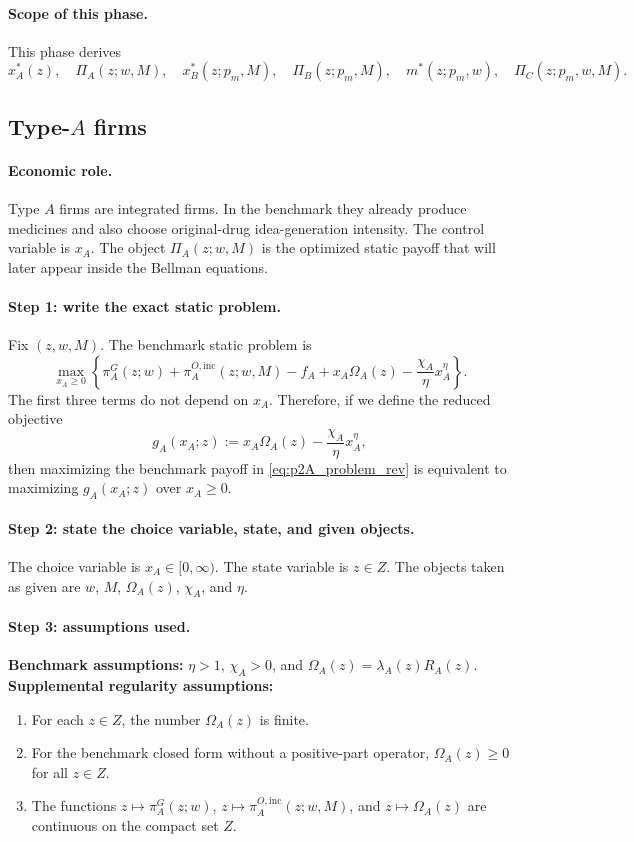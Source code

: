\paragraph{Scope of this phase.}
This phase derives
\[
x_A^*(z),\quad \Pi_A(z;w,M),\quad
x_B^*(z;p_m,M),\quad \Pi_B(z;p_m,M),\quad
m^*(z;p_m,w),\quad \Pi_C(z;p_m,w,M).
\]

\subsection{Type-$A$ firms}

\paragraph{Economic role.}
Type $A$ firms are integrated firms. In the benchmark they already produce medicines and also choose original-drug idea-generation intensity. The control variable is $x_A$. The object $\Pi_A(z;w,M)$ is the optimized static payoff that will later appear inside the Bellman equations.

\paragraph{Step 1: write the exact static problem.}
Fix $(z,w,M)$. The benchmark static problem is
\begin{equation}
\max_{x_A\ge 0}
\left\{
\pi_A^G(z;w)+\pi_A^{O,\mathrm{inc}}(z;w,M)-f_A
+x_A\Omega_A(z)-\frac{\chi_A}{\eta}x_A^\eta
\right\}.
\label{eq:p2A_problem_rev}
\end{equation}
The first three terms do not depend on $x_A$. Therefore, if we define the reduced objective
\[
g_A(x_A;z):=x_A\Omega_A(z)-\frac{\chi_A}{\eta}x_A^\eta,
\]
then maximizing the benchmark payoff in \eqref{eq:p2A_problem_rev} is equivalent to maximizing $g_A(x_A;z)$ over $x_A\ge 0$.

\paragraph{Step 2: state the choice variable, state, and given objects.}
The choice variable is $x_A\in[0,\infty)$. The state variable is $z\in Z$. The objects taken as given are $w$, $M$, $\Omega_A(z)$, $\chi_A$, and $\eta$.

\paragraph{Step 3: assumptions used.}
\textbf{Benchmark assumptions:} $\eta>1$, $\chi_A>0$, and $\Omega_A(z)=\lambda_A(z)R_A(z)$.  
\textbf{Supplemental regularity assumptions:}
\begin{enumerate}
    \item[(A1)] For each $z\in Z$, the number $\Omega_A(z)$ is finite.
    \item[(A2)] For the benchmark closed form without a positive-part operator, $\Omega_A(z)\ge 0$ for all $z\in Z$.
    \item[(A3)] The functions $z\mapsto \pi_A^G(z;w)$, $z\mapsto \pi_A^{O,\mathrm{inc}}(z;w,M)$, and $z\mapsto \Omega_A(z)$ are continuous on the compact set $Z$.
\end{enumerate}

